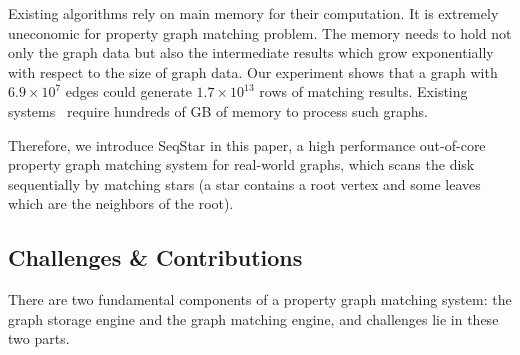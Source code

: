 
Existing algorithms rely on main memory for their computation. It is extremely uneconomic for property graph matching problem. The memory needs to hold not only the graph data but also the intermediate results which grow exponentially with respect to the size of graph data. Our experiment shows that a graph with $6.9 \times 10^{7}$ edges could generate $1.7 \times 10^{13}$ rows of matching results.
Existing systems~\cite{DBLP:conf/sosp/TeixeiraFSSZA15,DBLP:conf/sigmod/DiasTGM019,DBLP:journals/pvldb/MhedhbiS19} require hundreds of GB of memory to process such graphs.

Therefore, we introduce SeqStar in this paper, a high performance out-of-core property graph matching system for real-world graphs, which scans the disk sequentially by matching stars (a star contains a root vertex and some leaves which are the neighbors of the root).


\subsection*{Challenges \& Contributions}
There are two fundamental components of a property graph matching system:
the graph storage engine and the graph matching engine,
and challenges lie in these two parts.

